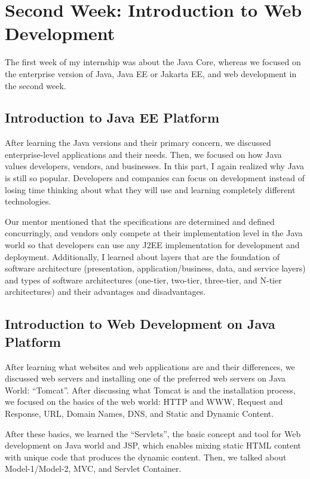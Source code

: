 \section{Second Week: Introduction to Web Development}

The first week of my internship was about the Java Core, whereas we focused on the enterprise version of Java, Java EE or Jakarta EE, and web development in the second week.

\subsection{Introduction to Java EE Platform}

After learning the Java versions and their primary concern, we discussed enterprise-level applications and their needs. Then, we focused on how Java values developers, vendors, and businesses. In this part, I again realized why Java is still so popular. Developers and companies can focus on development instead of losing time thinking about what they will use and learning completely different technologies.

Our mentor mentioned that the specifications are determined and defined concurringly, and vendors only compete at their implementation level in the Java world so that developers can use any J2EE implementation for development and deployment. Additionally, I learned about layers that are the foundation of software architecture (presentation, application/business, data, and service layers) and types of software architectures (one-tier, two-tier, three-tier, and N-tier architectures) and their advantages and disadvantages.

\subsection{Introduction to Web Development on Java Platform}

After learning what websites and web applications are and their differences, we discussed web servers and installing one of the preferred web servers on Java World: ``Tomcat''. After discussing what Tomcat is and the installation process, we focused on the basics of the web world: HTTP and WWW, Request and Response, URL, Domain Names, DNS, and Static and Dynamic Content.

After these basics, we learned the ``Servlets'', the basic concept and tool for Web development on Java world and JSP, which enables mixing static HTML content with unique code that produces the dynamic content. Then, we talked about Model-1/Model-2, MVC, and Servlet Container.

